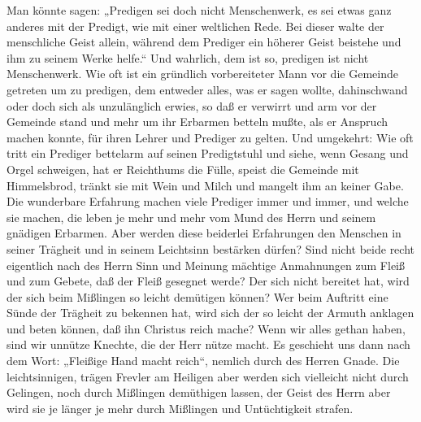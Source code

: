 Man könnte sagen: „Predigen sei doch nicht Menschenwerk, es sei etwas ganz anderes mit der Predigt, wie mit einer weltlichen Rede. Bei dieser walte der menschliche Geist allein, während dem Prediger ein höherer Geist beistehe und ihm zu seinem Werke helfe.“ Und wahrlich, dem ist so, predigen ist nicht Menschenwerk. Wie oft ist ein gründlich vorbereiteter Mann vor die Gemeinde getreten um zu predigen, dem entweder alles, was er sagen wollte, dahinschwand oder doch sich als unzulänglich erwies, so daß er verwirrt und arm vor der Gemeinde stand und mehr um ihr Erbarmen betteln mußte, als er Anspruch machen konnte, für ihren Lehrer und Prediger zu gelten. Und umgekehrt: Wie oft tritt ein Prediger bettelarm auf seinen Predigtstuhl und siehe, wenn Gesang und Orgel schweigen, hat er Reichthums die Fülle, speist die Gemeinde mit Himmelsbrod, tränkt sie mit Wein und Milch
und mangelt ihm an keiner Gabe. Die wunderbare Erfahrung machen viele Prediger immer und immer, und welche sie machen, die leben je mehr und mehr vom Mund des Herrn und seinem gnädigen Erbarmen. Aber werden diese beiderlei Erfahrungen den Menschen in seiner Trägheit und in seinem Leichtsinn bestärken dürfen? Sind nicht beide recht eigentlich nach des Herrn Sinn und Meinung mächtige Anmahnungen zum Fleiß und zum Gebete, daß der Fleiß gesegnet werde? Der sich nicht bereitet hat, wird der sich beim Mißlingen so leicht demütigen können? Wer beim Auftritt eine Sünde der Trägheit zu bekennen hat, wird sich der so leicht der Armuth anklagen und beten können, daß ihn Christus reich mache? Wenn wir alles gethan haben, sind wir unnütze Knechte, die der Herr nütze macht. Es geschieht uns dann nach dem Wort: „Fleißige Hand macht reich“, nemlich durch des Herren Gnade. Die leichtsinnigen, trägen Frevler am Heiligen aber werden sich vielleicht nicht durch Gelingen, noch durch Mißlingen demüthigen lassen, der Geist des Herrn aber wird sie je länger je mehr durch Mißlingen und Untüchtigkeit strafen.

